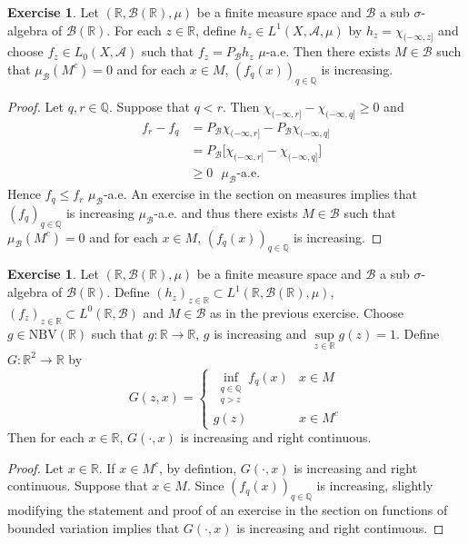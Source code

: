 \documentclass[12pt]{amsart}
\theoremstyle{definition}
\newtheorem{ex}[definition]{Exercise}
\newcommand{\sig}{\sigma}
\newcommand{\R}{\mathbb{R}}
\newcommand{\Q}{\mathbb{Q}}
\newcommand{\MA}{\mathcal{A}}
\newcommand{\MB}{\mathcal{B}}
\newcommand{\NBV}{\text{NBV}}
\begin{document}
	\begin{ex}
		Let $(\R, \MB(\R), \mu)$ be a finite measure space and $\MB$ a sub $\sig$-algebra of $\MB(\R)$. For each $z \in \R$, define $h_z \in L^1(X, \MA, \mu)$ by $h_z = \chi_{(-\infty, z]}$ and choose $f_z \in L_0(X, \MA)$ such that $f_z = P_{\MB}h_z$ $\mu$-a.e. Then there exists $M \in \MB$ such that $\mu_{\MB}(M^c) = 0$ and for each $x \in M$, $(f_q(x))_{q \in \Q}$ is increasing.
	\end{ex}
	
	\begin{proof}
		Let $q, r \in \Q$. Suppose that $q < r$. Then $\chi_{(-\infty, r]} - \chi_{(-\infty, q]} \geq 0$ and
		\begin{align*}
			f_r - f_q 
			& = P_{\MB} \chi_{(-\infty, r]} - P_{\MB} \chi_{(-\infty, q]} \\
			& = P_{\MB} \bigg[ \chi_{(-\infty, r]} - \chi_{(-\infty, q]} \bigg] \\\
			& \geq 0 \text{ $\mu_{\MB}$-a.e.}
		\end{align*}
		Hence $f_q \leq f_r$ $\mu_{\MB}$-a.e. An exercise in the section on measures implies that $(f_q)_{q \in \Q}$ is increasing $\mu_{\MB}$-a.e. and thus there exists $M \in \MB$ such that $\mu_{\MB}(M^c) = 0$ and for each $x \in M$, $(f_q(x))_{q \in \Q}$ is increasing.
	\end{proof}
	
	\begin{ex}
		Let $(\R, \MB(\R), \mu)$ be a finite measure space and $\MB$ a sub $\sig$-algebra of $\MB(\R)$. Define $(h_z)_{z \in \R} \subset L^1(\R, \MB(\R), \mu)$, $(f_z)_{z \in \R} \subset L^0(\R, \MB)$ and $M \in \MB$ as in the previous exercise. Choose $g \in \NBV(\R)$ such that $g: \R \rightarrow \R$, $g$ is increasing and $\sup\limits_{z \in \R} g(z) = 1$. Define $G: \R^2 \rightarrow \R$ by 
		\[
		G(z, x) = 
		\begin{cases}
			\inf\limits_{\substack{q \in \Q \\ q > z}}f_q(x) & x \in M \\
			g(z) & x \in M^c
		\end{cases}
		\] 
		Then for each $x \in \R$, $G(\cdot, x)$ is increasing and right continuous.
	\end{ex}

	\begin{proof}
		Let $x \in \R$. If $x \in M^c$, by defintion, $G(\cdot, x)$ is increasing and right continuous. Suppose that $x \in M$. Since $(f_q(x))_{q \in \Q}$ is increasing, slightly modifying the statement and proof of an exercise in the section on functions of bounded variation implies that $G(\cdot, x)$ is increasing and right continuous.
	\end{proof}
\end{document}
